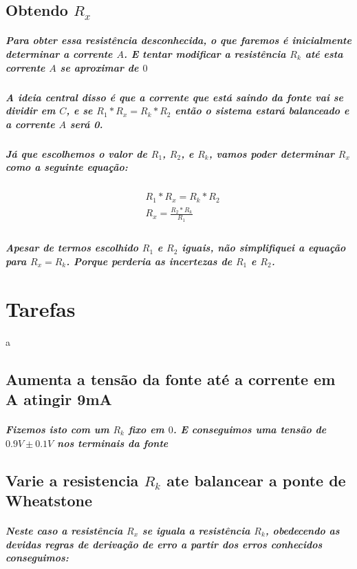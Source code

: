 \documentclass[12pt,twoside, a4paper, twocolumn]{article}
\begin{document}
\subsection{Obtendo $R_x$}

\subparagraph*{Para obter essa resistência desconhecida, o que faremos é inicialmente determinar a corrente $A$. E tentar modificar a resistência $R_k$ até esta corrente $A$ se aproximar de $0$}

\subparagraph*{A ideia central disso é que a corrente que está saindo da fonte vai se dividir em $C$, e se $R_1 * R_x = R_k * R_2$ então o sistema estará balanceado e a corrente $A$ será 0.}

\subparagraph*{Já que escolhemos o valor de $R_1$, $R_2$, e $R_k$, vamos poder determinar $R_x$ como a seguinte equação:}


\begin{equation}
    \begin{aligned}
         & R_1 * R_x  = R_k * R_2       \\
         & R_x = \frac{R_2 * R_k}{R_1 } \\
    \end{aligned}
\end{equation}

\subparagraph*{Apesar de termos escolhido $R_1$ e $R_2$ iguais, não simplifiquei a equação para $R_x = R_k$. Porque perderia as incertezas de $R_1$ e $R_2$. }




\section{Tarefas}
a
\subsection{Aumenta a tensão da fonte até a corrente em A atingir 9mA}

\subparagraph*{Fizemos isto com um $R_k$ fixo em $0$. E conseguimos uma tensão de $0.9V \pm 0.1V$ nos terminais da fonte}

\subsection{Varie a resistencia $R_k$ ate balancear a ponte de Wheatstone}

\subparagraph*{Neste caso a resistência $R_x$ se iguala a resistência $R_k$, obedecendo as devidas regras de derivação de erro a partir dos erros conhecidos conseguimos:}
\end{document}
